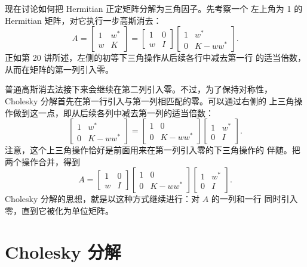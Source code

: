\documentclass[UTF8,fontset=none,12pt]{ctexart}
\begin{document}
现在讨论如何把 Hermitian 正定矩阵分解为三角因子。先考察一个
左上角为 1 的 Hermitian 矩阵，对它执行一步高斯消去：
\[
A=
\begin{bmatrix}
1&w^*\\
w&K
\end{bmatrix}
=
\begin{bmatrix}
1&0\\
w&I
\end{bmatrix}
\begin{bmatrix}
1&w^*\\
0&K-ww^*
\end{bmatrix}.
\]
正如第 20 讲所述，左侧的初等下三角操作从后续各行中减去第一行
的适当倍数，从而在矩阵的第一列引入零。

普通高斯消去法接下来会继续在第二列引入零。不过，为了保持对称性，
Cholesky 分解首先在第一行引入与第一列相匹配的零。可以通过右侧的
上三角操作做到这一点，即从后续各列中减去第一列的适当倍数：
\[
\begin{bmatrix}
1&w^*\\
0&K-ww^*
\end{bmatrix}
=
\begin{bmatrix}
1&0\\
0&K-ww^*
\end{bmatrix}
\begin{bmatrix}
1&w^*\\
0&I
\end{bmatrix}.
\]
注意，这个上三角操作恰好是前面用来在第一列引入零的下三角操作的
伴随。把两个操作合并，得到
\begin{equation}
A=
\begin{bmatrix}
1&0\\
w&I
\end{bmatrix}
\begin{bmatrix}
1&0\\
0&K-ww^*
\end{bmatrix}
\begin{bmatrix}
1&w^*\\
0&I
\end{bmatrix}.
\tag{23.1}
\end{equation}
Cholesky 分解的思想，就是以这种方式继续进行：对 $A$ 的一列和一行
同时引入零，直到它被化为单位矩阵。

\section*{Cholesky 分解}
\end{document}
